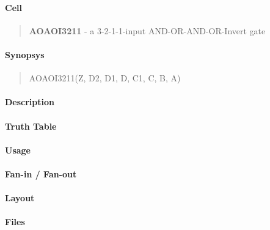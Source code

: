 \label{AOAOI3211}
\paragraph{Cell}
\begin{quote}
    \textbf{AOAOI3211} - a 3-2-1-1-input AND-OR-AND-OR-Invert gate
\end{quote}

\paragraph{Synopsys}
\begin{quote}
    AOAOI3211(Z, D2, D1, D, C1, C, B, A)
\end{quote}

\paragraph{Description}

%

\paragraph{Truth Table}
%

\paragraph{Usage}

\paragraph{Fan-in / Fan-out}

\paragraph{Layout}

\paragraph{Files}
